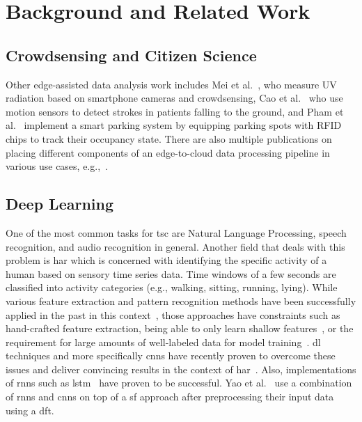 \cleardoublepage
\chapter{Background and Related Work}
\label{cha:background}

\section{Crowdsensing and Citizen Science}
\label{sec:crowdsensing_background}
Other edge-assisted data analysis work includes Mei et al.~\cite{mei2017ultraviolet}, who measure UV radiation based on smartphone cameras and crowdsensing,
Cao et al.~\cite{cao2015fast} who use motion sensors to detect strokes in patients falling to the ground, and
Pham et al.~\cite{pham2015a} implement a smart parking system by equipping parking spots with RFID chips to track their occupancy state.
There are also multiple publications on placing different components of an edge-to-cloud data processing pipeline in various use cases, e.g.,~\cite{lujic2021increasing,pfandzelter2021zero,hattab2019optimized}.

\section{Deep Learning}
\label{sec:deep_learning_background}
One of the most common tasks for \ac{tsc} are Natural Language Processing, speech recognition, and audio recognition in general.
Another field that deals with this problem is \acf{har} which is concerned with identifying the specific activity of a human based on sensory time series data.
Time windows of a few seconds are classified into activity categories (e.g., walking, sitting, running, lying).
While various feature extraction and pattern recognition methods have been successfully applied in the past in this context~\cite{bulling2014tutorial}, those approaches have constraints such as hand-crafted feature extraction, being able to only learn shallow features~\cite{yang2015deep}, or the requirement for large amounts of well-labeled data for model training~\cite{wang2019deep}.
\acl{dl} techniques and more specifically \acp{cnn} have recently proven to overcome these issues and deliver convincing results in the context of \ac{har}~\cite{wang2019deep,ronao2015deep}.
Also, implementations of \acp{rnn} such as \ac{lstm}~\cite{tao2016multicolumn,yao2017deepsense} have proven to be successful.
Yao et al.\ \cite{yao2017deepsense} use a combination of \acp{rnn} and \acp{cnn} on top of a \ac{sf} approach after preprocessing their input data using a \ac{dft}.

